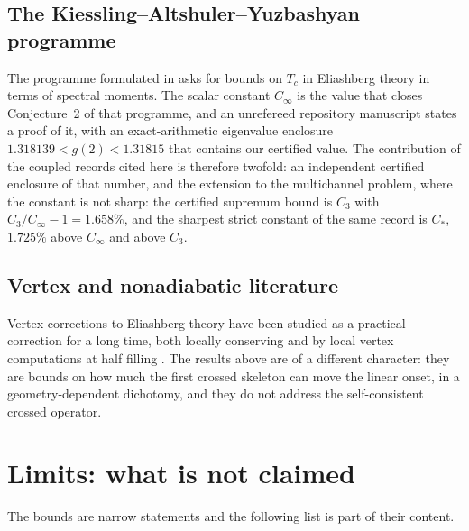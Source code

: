 \documentclass[aps,10pt,superscriptaddress,floatfix,amsmath,amssymb,nofootinbib]{revtex4-2}
\newcommand{\Cinf}{C_\infty}
\newcommand{\Cthree}{C_{3}}
\newcommand{\Cstar}{C_{*}}
\begin{document}
\subsection{The Kiessling--Altshuler--Yuzbashyan programme}

The programme formulated in \cite{kay} asks for bounds on $T_c$ in Eliashberg theory in terms
of spectral moments. The scalar constant $\Cinf$ is the value that closes Conjecture~2 of
that programme, and an unrefereed repository manuscript \cite{kondratev} states a proof of
it, with an exact-arithmetic eigenvalue enclosure $1.318139<g(2)<1.31815$ that contains our
certified value. The contribution of the coupled records cited here is therefore
twofold: an independent certified enclosure of that number, and the extension to the
multichannel problem, where the constant is not sharp: the certified supremum bound is
$\Cthree$ with $\Cthree/\Cinf-1=1.658\%$, and the sharpest strict constant of the same record
is $\Cstar$, $1.725\%$ above $\Cinf$ and above $\Cthree$.

\subsection{Vertex and nonadiabatic literature}

Vertex corrections to Eliashberg theory have been studied as a practical correction for a
long time, both locally conserving \cite{miller} and by local vertex computations at
half filling \cite{paci}. The results above are of a different character: they are bounds on
how much the first crossed skeleton can move the linear onset, in a geometry-dependent
dichotomy, and they do not address the self-consistent crossed operator.

\section{Limits: what is not claimed}\label{sec:limits}

The bounds are narrow statements and the following list is part of their content.
\end{document}
